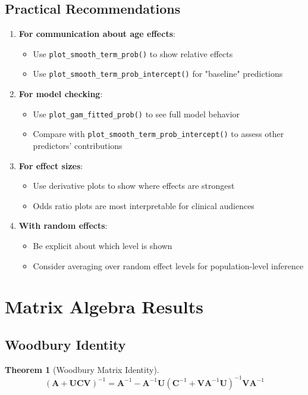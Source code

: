 \documentclass[11pt, a4paper]{article}
\newtheorem{theorem}{Theorem}
\begin{document}
\subsection{Practical Recommendations}

\begin{enumerate}
   \item \textbf{For communication about age effects}:
   \begin{itemize}
       \item Use \texttt{plot\_smooth\_term\_prob()} to show relative effects
       \item Use \texttt{plot\_smooth\_term\_prob\_intercept()} for "baseline" predictions
   \end{itemize}
   
   \item \textbf{For model checking}:
   \begin{itemize}
       \item Use \texttt{plot\_gam\_fitted\_prob()} to see full model behavior
       \item Compare with \texttt{plot\_smooth\_term\_prob\_intercept()} to assess other predictors' contributions
   \end{itemize}
   
   \item \textbf{For effect sizes}:
   \begin{itemize}
       \item Use derivative plots to show where effects are strongest
       \item Odds ratio plots are most interpretable for clinical audiences
   \end{itemize}
   
   \item \textbf{With random effects}:
   \begin{itemize}
       \item Be explicit about which level is shown
       \item Consider averaging over random effect levels for population-level inference
   \end{itemize}
\end{enumerate}

\appendix

\section{Matrix Algebra Results}

\subsection{Woodbury Identity}
\begin{theorem}[Woodbury Matrix Identity]
\begin{equation}
(\mathbf{A} + \mathbf{U}\mathbf{C}\mathbf{V})^{-1} = \mathbf{A}^{-1} - \mathbf{A}^{-1}\mathbf{U}(\mathbf{C}^{-1} + \mathbf{V}\mathbf{A}^{-1}\mathbf{U})^{-1}\mathbf{V}\mathbf{A}^{-1}
\end{equation}
\end{theorem}
\end{document}
